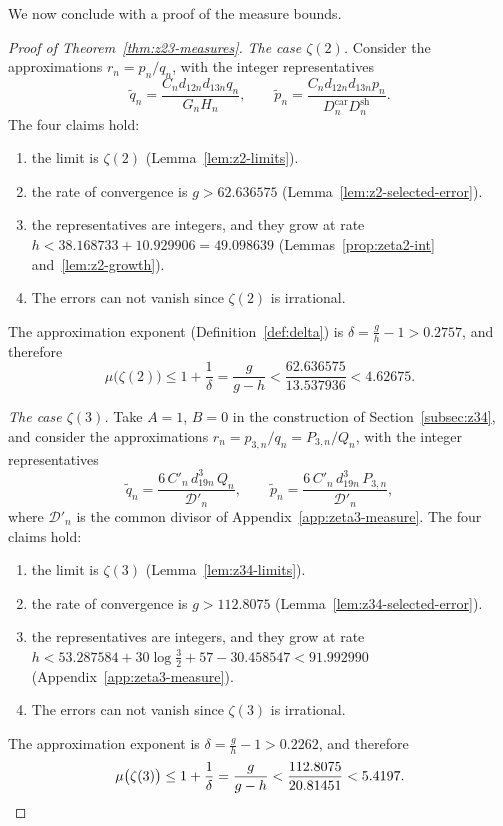 We now conclude with a proof of the measure bounds.
\begin{proof}[Proof of Theorem~\ref{thm:z23-measures}]
\emph{The case $\zeta(2)$.} Consider the approximations $r_n=p_n/q_n$,
with the integer representatives
\[
  \widetilde q_n=\frac{C_nd_{12n}d_{13n}q_n}{G_nH_n},\qquad
  \widetilde p_n=\frac{C_nd_{12n}d_{13n}p_n}{D^{\mathrm{car}}_nD^{\mathrm{sh}}_n}.
\]
The four claims hold:
\begin{enumerate}
\item the limit is $\zeta(2)$ (Lemma~\ref{lem:z2-limits}).
\item the rate of convergence is $g>62.636575$
  (Lemma~\ref{lem:z2-selected-error}).
\item the representatives are integers, and they grow at rate
  $h<38.168733+10.929906=49.098639$
  (Lemmas~\ref{prop:zeta2-int} and~\ref{lem:z2-growth}).
\item The errors can not vanish since $\zeta(2)$ is irrational.
\end{enumerate}
The approximation exponent (Definition~\ref{def:delta}) is
$\delta=\frac gh-1>0.2757$, and therefore
\[
  \mu\bigl(\zeta(2)\bigr)\le1+\frac1\delta=\frac{g}{g-h}
  <\frac{62.636575}{13.537936}<4.62675 .
\]

\emph{The case $\zeta(3)$.} Take $A=1$, $B=0$ in the construction of
Section~\ref{subsec:z34}, and consider the approximations
$r_n=p_{3,n}/q_n=P_{3,n}/Q_n$, with the integer representatives
\[
  \widetilde q_n=\frac{6\,C'_n\,d_{19n}^3\,Q_n}{\mathcal D'_n},\qquad
  \widetilde p_n=\frac{6\,C'_n\,d_{19n}^3\,P_{3,n}}{\mathcal D'_n},
\]
where $\mathcal D'_n$ is the common divisor of
Appendix~\ref{app:zeta3-measure}. The four claims hold:
\begin{enumerate}
\item the limit is $\zeta(3)$ (Lemma~\ref{lem:z34-limits}).
\item the rate of convergence is $g>112.8075$
  (Lemma~\ref{lem:z34-selected-error}).
\item the representatives are integers, and they grow at rate
  $h<53.287584+30\log\frac32+57-30.458547<91.992990$
  (Appendix~\ref{app:zeta3-measure}).
\item The errors can not vanish since $\zeta(3)$ is irrational.
\end{enumerate}
The approximation exponent is $\delta=\frac gh-1>0.2262$, and therefore
\[
  \mu\bigl(\zeta(3)\bigr)\le1+\frac1\delta=\frac{g}{g-h}
  <\frac{112.8075}{20.81451}<5.4197 .
\qedhere
\]
\end{proof}
